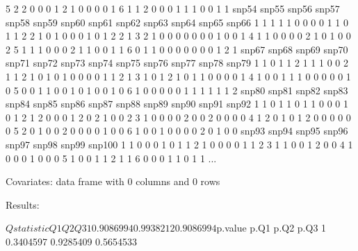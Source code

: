 \documentclass{article}
\begin{document}
\begin{Schunk}
\begin{Soutput}
5     2     2     0     0     0     1     2     1     0     0     0     0     1
6     1     1     2     0     0     0     1     1     1     0     0     1     1
  snp54 snp55 snp56 snp57 snp58 snp59 snp60 snp61 snp62 snp63 snp64 snp65 snp66
1     1     1     1     1     0     0     0     0     1     1     0     1     1
2     2     1     0     1     0     0     0     1     0     1     2     2     1
3     2     1     0     0     0     0     0     0     0     1     0     0     1
4     1     1     0     0     0     0     2     1     0     1     0     0     2
5     1     1     1     0     0     0     2     1     1     0     0     1     1
6     0     1     1     0     0     0     0     0     0     0     1     2     1
  snp67 snp68 snp69 snp70 snp71 snp72 snp73 snp74 snp75 snp76 snp77 snp78 snp79
1     1     0     1     1     2     1     1     1     0     0     2     1     1
2     1     0     1     0     1     0     0     0     0     1     1     2     1
3     1     0     1     2     1     0     1     1     0     0     0     0     1
4     1     0     0     1     1     1     0     0     0     0     0     1     0
5     0     0     1     1     0     0     1     0     1     0     0     1     0
6     1     0     0     0     0     0     1     1     1     1     1     1     2
  snp80 snp81 snp82 snp83 snp84 snp85 snp86 snp87 snp88 snp89 snp90 snp91 snp92
1     1     0     1     1     0     1     1     0     0     0     1     0     1
2     1     2     0     0     0     1     2     0     2     1     0     0     2
3     1     0     0     0     0     2     0     0     2     0     0     0     0
4     1     2     0     1     0     1     2     0     0     0     0     0     0
5     2     0     1     0     0     2     0     0     0     0     1     0     0
6     1     0     0     1     0     0     0     0     2     0     1     0     0
  snp93 snp94 snp95 snp96 snp97 snp98 snp99 snp100
1     1     0     0     0     1     0     1      1
2     1     0     0     0     0     1     1      2
3     1     1     0     0     1     2     0      0
4     1     0     0     0     1     0     0      0
5     1     0     0     1     1     2     1      1
6     0     0     0     1     1     0     1      1
...

Covariates:
data frame with 0 columns and 0 rows


Results:

$Qstatistic
         Q1        Q2        Q3
1 0.9086994 0.9938212 0.9086994

$p.value
       p.Q1      p.Q2      p.Q3
1 0.3404597 0.9285409 0.5654533
\end{Soutput}
\end{Schunk}
\end{document}
